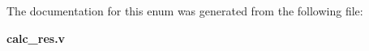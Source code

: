 \subsubsection[{res\-Y\-\_\-q}]{ {\bfseries \textcolor{vhdlchar}{ }} \hspace{0.3cm}}\label{enum1calc__res_a0f6b4cc97de341feb2975fb6f3c9b8b2}


The documentation for this enum was generated from the following file\-:\begin{DoxyCompactItemize}
\item 
{\bf calc\-\_\-res.\-v}\end{DoxyCompactItemize}
